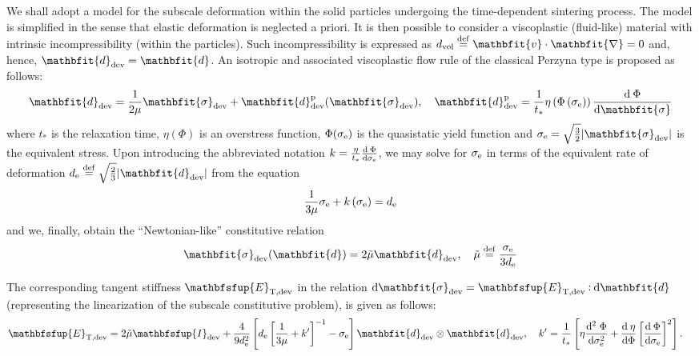\documentclass[10pt,a4paper,fleqn]{article}
\renewcommand{\ta}[1]{\mathbfit{#1}}
\renewcommand{\ts}[1]{\mathbfit{#1}}
\renewcommand{\tf}[1]{\mathbfsfup{#1}}
\newcommand{\tang}{\mathrm{T}}
\begin{document}
We shall adopt a model for the subscale deformation within the solid particles undergoing the time-dependent sintering process. The model is simplified in the sense that elastic deformation is neglected a priori. It is then possible to consider a viscoplastic (fluid-like) material with intrinsic incompressibility (within the particles). Such incompressibility is expressed as $d_\vol\defeq\ta{v}\cdot\ts{\nabla}=0$ and, hence, $\ts{d}_\dev=\ts{d}$. An isotropic and associated viscoplastic flow rule of the classical Perzyna type is proposed as follows:
\begin{equation}
    \ts{d}_\dev = \frac{1}{2\mu}\ts{\sigma}_\dev + \ts{d}_\dev^\pl(\ts{\sigma}_\dev), \quad
    \ts{d}_\dev^\pl = \frac{1}{t_*}\eta\left(\Phi\left(\sigma_\eqv\right)\right)\od{\Phi}{\ts\sigma}
\label{eq201}
\end{equation}
where $t_*$ is the relaxation time, $\eta(\Phi)$ is an overstress function, $\Phi(\sigma_{\mathrm{e}})$ is the quasistatic yield function and $\sigma_\eqv=\sqrt{\frac{3}{2}}|\ts{\sigma}_\dev|$ is the equivalent stress. Upon introducing the abbreviated notation $k=\frac{\eta}{t_*}\frac{\operatorname{d \!}\:\Phi}{\operatorname{d \!} \sigma_{\mathrm{e}}}$, we may solve for $\sigma_{\mathrm{e}}$ in terms of the equivalent rate of deformation $d_\eqv\defeq\sqrt{\frac{2}{3}}|\ts{d}_\dev|$ from the equation
\begin{equation}
    \frac{1}{3\mu}\sigma_{\mathrm{e}} + k\left(\sigma_{\mathrm{e}}\right) = d_{\mathrm{e}}
\label{eq202}
\end{equation}
and we, finally, obtain the ``Newtonian-like'' constitutive relation
\begin{equation}
    \ts{\sigma}_\dev(\ts{d}) = 2\tilde{\mu}\ts{d}_\dev, \quad
    \tilde{\mu}\defeq \frac{\sigma_\eqv}{3d_\eqv}
\label{eq203}
\end{equation}

The corresponding tangent stiffness $\tf{E}_{\tang,\dev}$ in the relation $\dif\ts{\sigma}_\dev=\tf{E}_{\tang,\dev}\dprod\dif\ts{d}$ (representing the linearization of the subscale constitutive problem), is given as follows:
\begin{align}
 \tf E_{\tang,\dev} &= 2\tilde{\mu} \tf I_\dev + \frac{4}{9 d_\eqv^2} \left[ d_\eqv \left[ \frac{1}{3\mu} + k' \right]^{-1} - \sigma_\eqv \right] \ts d_\dev \outerp\ts d_\dev
 ,\quad k' = \frac{1}{t_*}\left[\eta \frac{\mathrm{d}^2\;\Phi}{\dif\sigma_\eqv^2} + \od{\eta}{\Phi}\left[\od{\Phi}{\sigma_\eqv}\right]^2\right].
\end{align}
\end{document}
